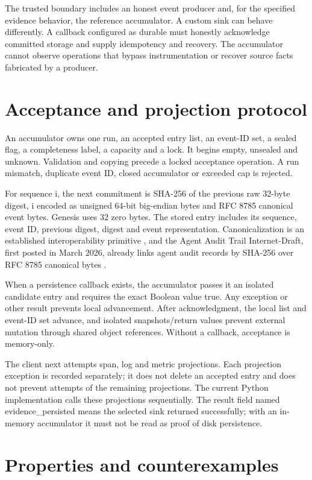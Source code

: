 \documentclass[10pt,letterpaper]{article}
\begin{document}
The trusted boundary includes an honest event producer and, for the specified evidence behavior, the reference accumulator. A custom sink can behave differently. A callback configured as durable must honestly acknowledge committed storage and supply idempotency and recovery. The accumulator cannot observe operations that bypass instrumentation or recover source facts fabricated by a producer.


\section{Acceptance and projection protocol}

An accumulator owns one run, an accepted entry list, an event-ID set, a sealed flag, a completeness label, a capacity and a lock. It begins empty, unsealed and unknown. Validation and copying precede a locked acceptance operation. A run mismatch, duplicate event ID, closed accumulator or exceeded cap is rejected.


For sequence i, the next commitment is SHA-256 of the previous raw 32-byte digest, i encoded as unsigned 64-bit big-endian bytes and RFC 8785 canonical event bytes. Genesis uses 32 zero bytes. The stored entry includes its sequence, event ID, previous digest, digest and event representation. Canonicalization is an established interoperability primitive \cite{ref5}, and the Agent Audit Trail Internet-Draft, first posted in March 2026, already links agent audit records by SHA-256 over RFC 8785 canonical bytes \cite{ref9}.


When a persistence callback exists, the accumulator passes it an isolated candidate entry and requires the exact Boolean value true. Any exception or other result prevents local advancement. After acknowledgment, the local list and event-ID set advance, and isolated snapshots/return values prevent external mutation through shared object references. Without a callback, acceptance is memory-only.


The client next attempts span, log and metric projections. Each projection exception is recorded separately; it does not delete an accepted entry and does not prevent attempts of the remaining projections. The current Python implementation calls these projections sequentially. The result field named evidence\_persisted means the selected sink returned successfully; with an in-memory accumulator it must not be read as proof of disk persistence.


\section{Properties and counterexamples}
\end{document}
